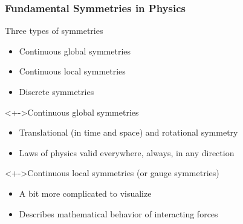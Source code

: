 \begin{frame}[t]
 \frametitle{Fundamental Symmetries in Physics}
 \begin{block}{Three types of symmetries}
  \begin{itemize}
   \item \alert<2>{Continuous global symmetries}
   \item \alert<3>{Continuous local symmetries}
   \item<+-> Discrete symmetries
  \end{itemize}
 \end{block}
 \begin{block}<+->{Continuous global symmetries}
  \begin{itemize}
   \item \alert{Translational} (in time and space) and \alert{rotational} symmetry
   \item Laws of physics valid everywhere, always, in any direction
  \end{itemize}
 \end{block}
 \begin{block}<+->{Continuous local symmetries (or gauge symmetries)}
  \begin{itemize}
   \item A bit more complicated to visualize
   \item Describes mathematical behavior of interacting forces
  \end{itemize}
 \end{block}
\end{frame}
